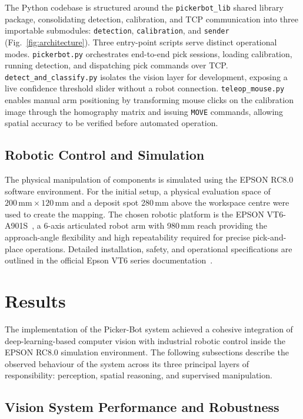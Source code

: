 \documentclass{MIPRO}
\begin{document}
The Python codebase is structured around the \texttt{pickerbot\_lib} shared library package, consolidating detection, calibration, and TCP communication into three importable submodules: \texttt{detection}, \texttt{calibration}, and \texttt{sender} (Fig.~\ref{fig:architecture}). Three entry-point scripts serve distinct operational modes. \texttt{pickerbot.py} orchestrates end-to-end pick sessions, loading calibration, running detection, and dispatching pick commands over TCP. \texttt{detect\_and\_classify.py} isolates the vision layer for development, exposing a live confidence threshold slider without a robot connection. \texttt{teleop\_mouse.py} enables manual arm positioning by transforming mouse clicks on the calibration image through the homography matrix and issuing \texttt{MOVE} commands, allowing spatial accuracy to be verified before automated operation.

\subsection{Robotic Control and Simulation}

The physical manipulation of components is simulated using the EPSON RC8.0 software environment. For the initial setup, a physical evaluation space of $200\,\text{mm} \times 120\,\text{mm}$ and a deposit spot 280\,mm above the workspace centre were used to create the mapping. The chosen robotic platform is the EPSON VT6-A901S~\cite{b2}, a 6-axis articulated robot arm with 980\,mm reach providing the approach-angle flexibility and high repeatability required for precise pick-and-place operations. Detailed installation, safety, and operational specifications are outlined in the official Epson VT6 series documentation~\cite{epsonvt6}.

\section{Results}

The implementation of the Picker-Bot system achieved a cohesive integration of deep-learning-based computer vision with industrial robotic control inside the EPSON RC8.0 simulation environment. The following subsections describe the observed behaviour of the system across its three principal layers of responsibility: perception, spatial reasoning, and supervised manipulation.

\subsection{Vision System Performance and Robustness}
\end{document}
